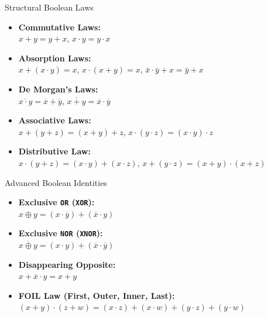 \begin{custombox}{Structural Boolean Laws}
\begin{itemize}
    \item \textbf{Commutative Laws:} \\
    \hspace*{15pt}$x + y = y + x$, \quad $x \cdot y = y \cdot x$
    
    \item \textbf{Absorption Laws:} \\
    \hspace*{15pt}$x + (x \cdot y) = x$, \quad $x \cdot (x + y) = x$, \quad $\bar{x} \cdot \bar{y}+x=\bar{y}+x$
    
    \item \textbf{De Morgan’s Laws:} \\
    \hspace*{15pt} $\overline{x \cdot y} = \overline{x} + \overline{y}$, \quad $\overline{x + y} = \overline{x} \cdot \overline{y}$
    \item \textbf{Associative Laws:} \\
    \hspace*{15pt} $x + (y + z) = (x + y) + z$, \quad $x \cdot (y \cdot z) = (x \cdot y) \cdot z$
    
    \item \textbf{Distributive Law:} \\
    \hspace*{15pt} $x \cdot (y + z) = (x \cdot y) + (x \cdot z)$, \quad $x + (y \cdot z) = (x + y) \cdot (x + z)$
\end{itemize}
\end{custombox}

\begin{custombox}{Advanced Boolean Identities}
\begin{itemize}
    \item \textbf{Exclusive \texttt{OR} (\texttt{XOR}):} \\
    \hspace*{15pt} $x \oplus y = (x \cdot \overline{y}) + (\overline{x} \cdot y)$
    
    \item \textbf{Exclusive \texttt{NOR} (\texttt{XNOR}):} \\
    \hspace*{15pt} $\overline{x \oplus y} = (x \cdot y) + (\overline{x} \cdot \overline{y})$
    
    \item \textbf{Disappearing Opposite:} \\
    \hspace*{15pt} $x + \overline{x} \cdot y = x + y$
    
    \item \textbf{FOIL Law (First, Outer, Inner, Last):} \\
    \hspace*{15pt} $(x + y) \cdot (z + w) = (x \cdot z) + (x \cdot w) + (y \cdot z) + (y \cdot w)$
\end{itemize}
\end{custombox}


